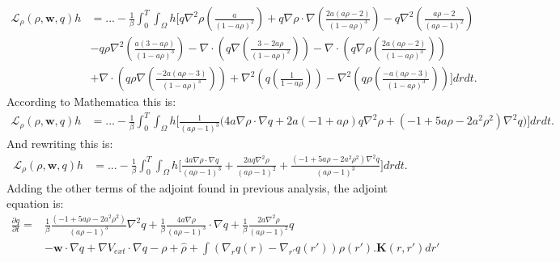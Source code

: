 \documentclass[11pt, a4paper]{article}
\theoremstyle{definition}
\newcommand{\w}{\mathbf{w}}
\newcommand{\K}{\mathbf{K}}
\newcommand{\hr}{\widehat \rho}
\begin{document}
\begin{align*}
	\mathcal{L}_\rho(\rho,\w,q)h &=... -\frac{1}{\beta}\int_0^T\int_\Omega h \bigg[  q\nabla^2 \rho \left(\frac{a}{(1- a\rho)^2}\right)  + q \nabla \rho \cdot \nabla \left(\frac{2a(a \rho -2)}{(1-a\rho)^3} \right) - q \nabla^2 \left(\frac{a\rho -2}{(a\rho -1)^2}\right)\\
	& - q\rho  \nabla^2  \left(\frac{a(3  - a \rho)}{(1-a\rho)^3} \right) -\nabla \cdot \left( q  \nabla \left( \frac{3-2a\rho}{(1-a\rho)^2} \right) \right)  - \nabla \cdot \left( q \nabla \rho  \left(\frac{2a(a \rho -2)}{(1-a\rho)^3}  \right)\right)  \\
	&  + \nabla \cdot\left( q\rho \nabla \left( \frac{-2a(a \rho- 3)}{(1-a\rho)^3} \right) \right)+   \nabla^2 \left(q \left(\frac{1}{1- a\rho} \right) \right) - \nabla^2 \left(q\rho \left(\frac{-a(a \rho -3)}{(1-a\rho)^3} \right)\right)\bigg] dr dt. 
\end{align*}
According to Mathematica this is:
\begin{align*}
	\mathcal{L}_\rho(\rho,\w,q)h &=... -\frac{1}{\beta}\int_0^T\int_\Omega h \bigg[ 
	\frac{1}{(a \rho -1)^3}\bigg(4 a \nabla \rho \cdot \nabla q + 
	2 a (-1 + a \rho) q \nabla^2 \rho + (-1 + 5 a \rho - 2 a^2 \rho^2) \nabla^2 q\bigg)
	\bigg] dr dt.
\end{align*}
And rewriting this is:
\begin{align*}
	\mathcal{L}_\rho(\rho,\w,q)h & =... -\frac{1}{\beta}\int_0^T\int_\Omega h \bigg[ 
	\frac{4 a \nabla \rho \cdot \nabla q}{(a \rho -1)^3}  +   \frac{2 a  q \nabla^2 \rho}{(a \rho -1)^2}  +   \frac{(-1 + 5 a \rho - 2 a^2 \rho^2) \nabla^2 q}{(a \rho -1)^3}
	\bigg] dr dt.
\end{align*}
Adding the other terms of the adjoint found in previous analysis, the adjoint equation is:
\begin{align*}
	\frac{\partial q}{\partial t} =&\frac{1}{\beta}\frac{(-1 + 5 a \rho - 2 a^2 \rho^2) }{(a \rho -1)^3}\nabla^2 q +\frac{1}{\beta} \frac{4 a \nabla \rho }{(a \rho -1)^3}\cdot \nabla q +  \frac{1}{\beta} \frac{2 a   \nabla^2 \rho}{(a \rho -1)^2} q    \\
	&- \w \cdot \nabla q + \nabla V_{ext} \cdot \nabla q - \rho + \hr + \int \left(\nabla_r q(r) - \nabla_{r'} q(r') \right) \rho(r'). \K(r,r') dr'
\end{align*}
\end{document}
